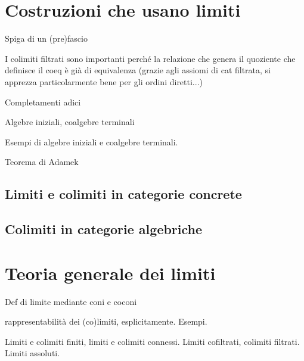 \section{Costruzioni che usano limiti}
\begin{example}
	Spiga di un (pre)fascio
\end{example}
\begin{remark}
	I colimiti filtrati sono importanti perché la relazione che genera il quoziente che definisce il coeq è già di equivalenza (grazie agli assiomi di cat filtrata, si apprezza particolarmente bene per gli ordini diretti...)
\end{remark}
\begin{example}
	Completamenti adici
\end{example}
\begin{example}
	Algebre iniziali, coalgebre terminali
\end{example}
\begin{examples}
	Esempi di algebre iniziali e coalgebre terminali.
\end{examples}
\begin{theorem}
	Teorema di Adamek
\end{theorem}
\subsection{Limiti e colimiti in categorie concrete}
\subsection{Colimiti in categorie algebriche}
\begin{esercizi}
	\item
	\item
	\item
	\item
	\item
\end{esercizi}

\section{Teoria generale dei limiti}

Def di limite mediante coni e coconi

rappresentabilità dei (co)limiti, esplicitamente.
Esempi.

Limiti e colimiti finiti, limiti e colimiti connessi.
Limiti cofiltrati, colimiti filtrati.
Limiti assoluti.

